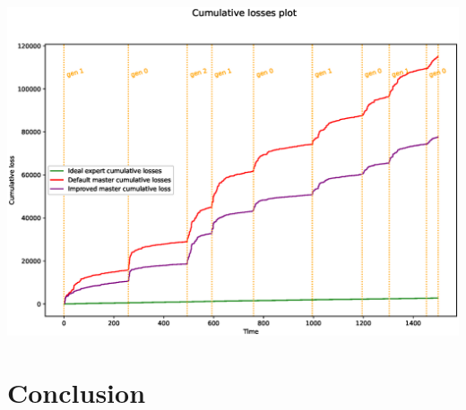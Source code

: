 \documentclass[12pt, twoside]{article}
\begin{document}
\includegraphics[width=1\linewidth]{improvement3}

\section{Conclusion}

%
%
%
\end{document}
